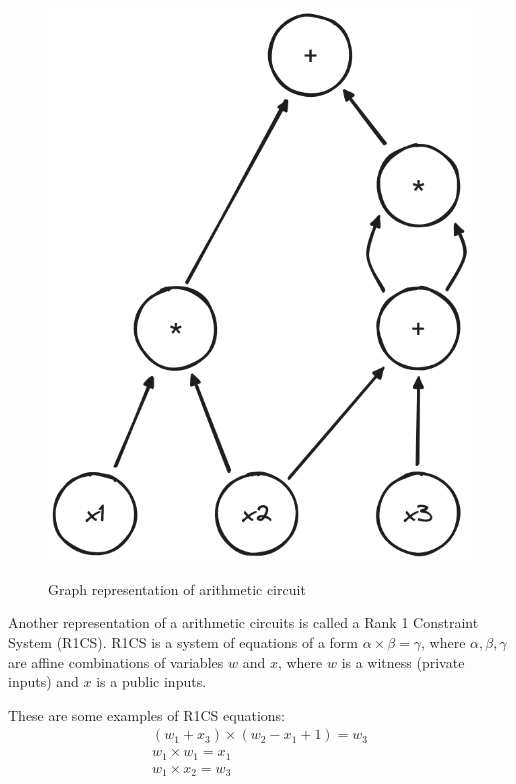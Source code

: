 \begin{figure}[h]
    \centering
    \includegraphics[scale=0.25]{assets/images/dag_example.png}
    \caption{Graph representation of arithmetic circuit}
    \label{fig:dag_example}
	\cite{youtuMOOCLecture3}
    \vspace{0.5cm}
\end{figure}

Another representation of a arithmetic circuits is called a Rank 1 Constraint
System (R1CS). R1CS is a system of equations of a form $\alpha \times \beta = \gamma$,
where $\alpha, \beta, \gamma$ are affine combinations of variables $w$ and $x$,
where $w$ is a witness (private inputs) and $x$ is a public inputs.

These are some examples of R1CS equations:
\begin{displaymath}
    \begin{array}{l}
        (w_1 + x_3) \times (w_2 - x_1 + 1) = w_3 \\
        w_1 \times w_1 = x_1                     \\
        w_1 \times x_2 = w_3
    \end{array}
\end{displaymath}

